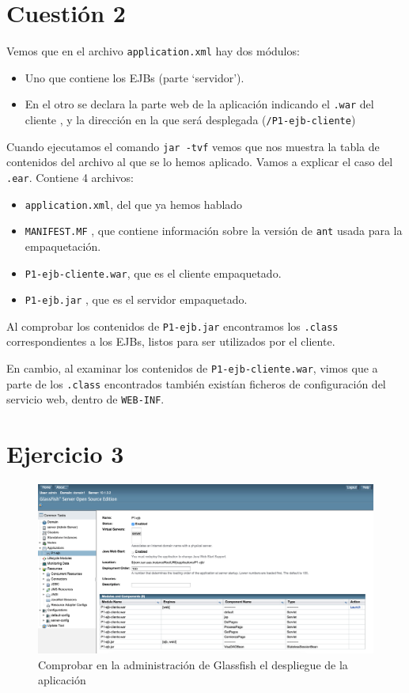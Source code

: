 \documentclass[a4paper, 10pt]{article}
\begin{document}
\pagebreak

\section{Cuestión 2}
	Vemos que en el archivo \texttt{application.xml} hay dos módulos:
	\begin{itemize}
		\item Uno que contiene los EJBs (parte `servidor').
		\item En el otro se declara la parte web de la aplicación indicando el \texttt{.war} del cliente , y la dirección en la que será desplegada (\texttt{/P1-ejb-cliente})
	 \end{itemize}
	 
	 Cuando ejecutamos el comando \texttt{jar -tvf} vemos que nos muestra la tabla de contenidos del archivo al que se lo hemos aplicado. Vamos a explicar el caso del \texttt{.ear}. Contiene 4 archivos:

	 \begin{itemize}
	 	\item \texttt{application.xml}, del que ya hemos hablado
	 	\item \texttt{MANIFEST.MF} , que contiene información sobre la versión de \texttt{ant} usada para la empaquetación.
	 	\item \texttt{P1-ejb-cliente.war}, que es el cliente empaquetado.
	 	\item \texttt{P1-ejb.jar} , que es el servidor empaquetado.
	 \end{itemize} 

	 Al comprobar los contenidos de \texttt{P1-ejb.jar} encontramos los \texttt{.class} correspondientes a los EJBs, listos para ser utilizados por el cliente.

	 En cambio, al examinar los contenidos de \texttt{P1-ejb-cliente.war}, vimos que a parte de los \texttt{.class} encontrados también existían ficheros de configuración del servicio web, dentro de \texttt{WEB-INF}.
	

 \section{Ejercicio 3}
 
	 \begin{figure}[hbtp]
	 	\centering
	 	\includegraphics[width=1.1\textwidth]{pantallazos/ejercicio3.png}
	 	\caption{Comprobar en la administración de Glassfish el despliegue de la aplicación}
	 \end{figure}
 
\end{document}
